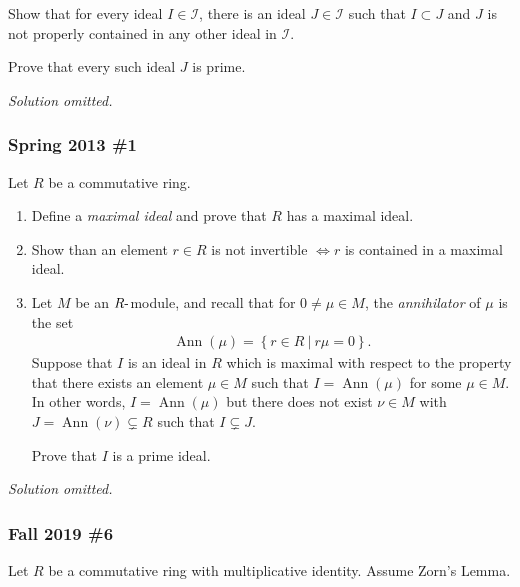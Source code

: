 Show that for every ideal \(I\in {\mathcal{I}}\), there is an ideal
\(J\in {\mathcal{I}}\) such that \(I\subset J\) and \(J\) is not
properly contained in any other ideal in \({\mathcal{I}}\).

Prove that every such ideal \(J\) is prime.

\emph{Solution omitted.}

\hypertarget{spring-2013-1}{%
\subsubsection{Spring 2013 \#1}\label{spring-2013-1}}

Let \(R\) be a commutative ring.

\begin{enumerate}
\def\labelenumi{\alph{enumi}.}
\item
  Define a \emph{maximal ideal} and prove that \(R\) has a maximal
  ideal.
\item
  Show than an element \(r\in R\) is not invertible \(\iff r\) is
  contained in a maximal ideal.
\item
  Let \(M\) be an \(R{\hbox{-}}\)module, and recall that for
  \(0\neq \mu \in M\), the \emph{annihilator} of \(\mu\) is the set
  \begin{align*}
  \operatorname{Ann}(\mu) = \left\{{r\in R {~\mathrel{\Big\vert}~}r\mu = 0}\right\}
  .\end{align*}
  Suppose that \(I\) is an ideal in \(R\) which is maximal with respect
  to the property that there exists an element \(\mu \in M\) such that
  \(I = \operatorname{Ann}(\mu)\) for some \(\mu \in M\). In other
  words, \(I = \operatorname{Ann}(\mu)\) but there does not exist
  \(\nu\in M\) with \(J = \operatorname{Ann}(\nu) \subsetneq R\) such
  that \(I\subsetneq J\).

  Prove that \(I\) is a prime ideal.
\end{enumerate}

\emph{Solution omitted.}

\hypertarget{fall-2019-6}{%
\subsubsection{Fall 2019 \#6}\label{fall-2019-6}}

Let \(R\) be a commutative ring with multiplicative identity. Assume
Zorn's Lemma.

